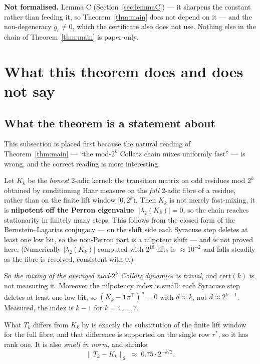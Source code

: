 \documentclass[12pt,a4paper]{article}
\newcommand{\cert}{\mathrm{cert}}
\begin{document}
\textbf{Not formalised.} Lemma C (Section~\ref{sec:lemmaC}) --- it sharpens the constant rather
than feeding it, so Theorem~\ref{thm:main} does not depend on it --- and the non-degeneracy
$g_c \ne 0$, which the certificate also does not use. Nothing else in the chain of
Theorem~\ref{thm:main} is paper-only.

\section{What this theorem does and does not say}\label{sec:scope}

\subsection*{What the theorem is a statement about}

This subsection is placed first because the natural reading of Theorem~\ref{thm:main} --- ``the
mod-$2^k$ Collatz chain mixes uniformly fast'' --- is wrong, and the correct reading is more
interesting.

Let $K_k$ be the \emph{honest} 2-adic kernel: the transition matrix on odd residues mod $2^k$
obtained by conditioning Haar measure on the \emph{full} 2-adic fibre of a residue, rather than
on the finite lift window $[0,2^k)$. Then $K_k$ is not merely fast-mixing, it is
\textbf{nilpotent off the Perron eigenvalue}: $|\lambda_2(K_k)| = 0$, so the chain reaches
stationarity in finitely many steps. This follows from the closed form of the Bernstein--Lagarias
conjugacy \cite{BernsteinLagarias1996} --- on the shift side each Syracuse step deletes at least
one low bit, so the non-Perron part is a nilpotent shift --- and is not proved here. (Numerically
$|\lambda_2(K_k)|$ computed with $2^{18}$ lifts is $\approx 10^{-2}$ and falls steadily as the
fibre is resolved, consistent with $0$.)

So \emph{the mixing of the averaged mod-$2^k$ Collatz dynamics is trivial}, and
$\cert(k)$ is not measuring it. Moreover the nilpotency index is small: each Syracuse step
deletes at least one low bit, so $(K_k - \mathbf{1}\pi^\top)^{\,d} = 0$ with $d \approx k$, not
$d \approx 2^{k-1}$. Measured, the index is $k-1$ for $k = 4,\dots,7$.

What $T_k$ differs from $K_k$ by is exactly the substitution of the finite lift window for the
full fibre, and that difference is supported on the single row $r^\ast$, so it has rank one. It is
also \emph{small in norm}, and shrinks:
\[
  \|T_k - K_k\|_2 \;\approx\; 0.75 \cdot 2^{-k/2} .
\]
\end{document}
